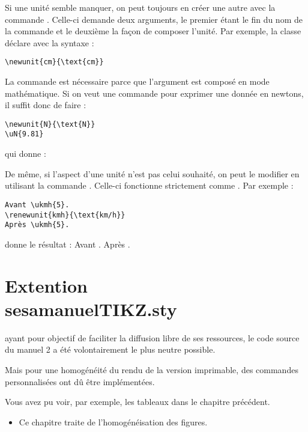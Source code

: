 \documentclass[nocrop]{sesamanuel}
\begin{document}
Si une unité semble manquer, on peut toujours en créer une autre avec
la commande . Celle-ci demande deux arguments, le premier
étant le fin du nom de la commande et le deuxième la façon de composer
l'unité. Par exemple, la classe déclare  avec la syntaxe :
\begin{verbatim}
\newunit{cm}{\text{cm}}
\end{verbatim}
La commande  est nécessaire parce que l'argument est composé
en mode mathématique. Si on veut une commande pour exprimer une donnée
en newtons, il suffit donc de faire :
\begin{verbatim}
\newunit{N}{\text{N}}
\uN{9.81}
\end{verbatim}
qui donne :

De même, si l'aspect d'une unité n'est pas celui souhaité, on peut le
modifier en utilisant la commande . Celle-ci fonctionne
strictement comme . Par exemple :
\begin{verbatim}
Avant \ukmh{5}.
\renewunit{kmh}{\text{km/h}}
Après \ukmh{5}.
\end{verbatim}
donne le résultat :
Avant .
Après .


\chapter{Extention \\sesamanuelTIKZ.sty}\label{chTIKZ}

\begin{prerequis}
\Logosesa{} ayant pour objectif de faciliter la diffusion libre de ses ressources, le code source du manuel \Logosesa{} 2 a été volontairement le plus neutre possible. 

Mais pour une homogénéité du rendu de la version imprimable, des commandes personnalisées ont dû être implémentées. 
\vfill\columnbreak

Vous avez pu voir, par exemple, les tableaux dans le chapitre précédent. 

\begin{itemize}
 \item Ce chapitre traite de l'homogénéisation des figures. 
\end{itemize}

\end{prerequis}
\end{document}
